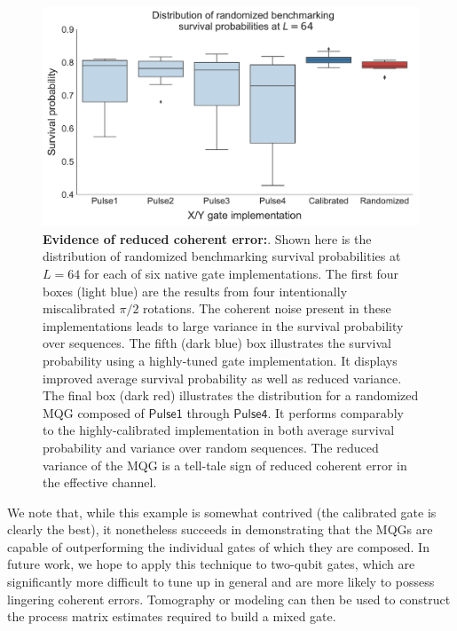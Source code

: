 \documentclass[aps,nofootinbib,pra,notitlepage,twocolumn]{revtex4-1}
\newcommand{\0}{\ensuremath{\mathbf{0}}}
\begin{document}
{\begin{figure}[t]
  \centering
  \includegraphics[width=\columnwidth]{rb_data.pdf}
  \caption{\textbf{Evidence of reduced coherent error:}. Shown here is the distribution of randomized benchmarking survival probabilities at $L=64$ for each of six native gate implementations. The first four boxes (light blue) are the results from four intentionally miscalibrated ${\pi/2}$ rotations. The coherent noise present in these implementations leads to large variance in the survival probability over sequences. The fifth (dark blue) box illustrates the survival probability using a highly-tuned gate implementation. It displays improved average survival probability as well as reduced variance. The final box (dark red) illustrates the distribution for a randomized MQG composed of $\mathsf{Pulse1}$ through $\mathsf{Pulse4}$. It performs comparably to the highly-calibrated implementation in both average survival probability and variance over random sequences. The reduced variance of the MQG is a tell-tale sign of reduced coherent error in the effective channel\cite{Ball2016}.}
  \label{fig:rb}
\end{figure}

We note that, while this example is somewhat contrived (the calibrated gate is clearly the best), it nonetheless succeeds in demonstrating that the MQGs are capable of outperforming the individual gates of which they are composed. In future work, we hope to apply this technique to two-qubit gates, which are significantly more difficult to tune up in general and are more likely to possess lingering coherent errors. Tomography or modeling can then be used to construct the process matrix estimates required to build a mixed gate. 



}
\end{document}
